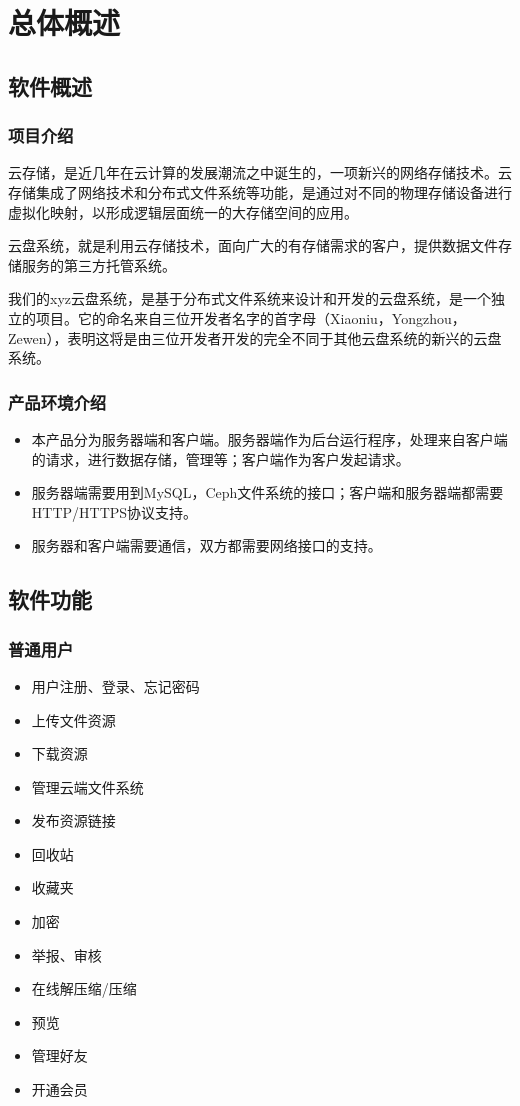 \chapter{总体概述}

\section{软件概述}
\subsection{项目介绍}
云存储，是近几年在云计算的发展潮流之中诞生的，一项新兴的网络存储技术。云存储集成了网络技术和分布式文件系统等功能，是通过对不同的物理存储设备进行虚拟化映射，以形成逻辑层面统一的大存储空间的应用。

云盘系统，就是利用云存储技术，面向广大的有存储需求的客户，提供数据文件存储服务的第三方托管系统。

我们的xyz云盘系统，是基于分布式文件系统来设计和开发的云盘系统，是一个独立的项目。它的命名来自三位开发者名字的首字母（Xiaoniu，Yongzhou，Zewen），表明这将是由三位开发者开发的完全不同于其他云盘系统的新兴的云盘系统。

\subsection{产品环境介绍}

\begin{itemize}
	\item 本产品分为服务器端和客户端。服务器端作为后台运行程序，处理来自客户端的请求，进行数据存储，管理等；客户端作为客户发起请求。
	\item 服务器端需要用到MySQL，Ceph文件系统的接口；客户端和服务器端都需要HTTP/HTTPS协议支持。
	\item 服务器和客户端需要通信，双方都需要网络接口的支持。
\end{itemize}
\section{软件功能}

\subsection{普通用户}
\begin{itemize}
	\item 用户注册、登录、忘记密码
	\item 上传文件资源
	\item 下载资源
	\item 管理云端文件系统
	\item 发布资源链接
	\item 回收站
	\item 收藏夹
	\item 加密
	\item 举报、审核
	\item 在线解压缩/压缩
	\item 预览
	\item 管理好友
	\item 开通会员
\end{itemize}

